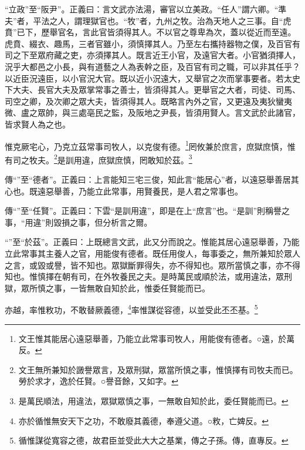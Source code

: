 {\noindent\shu{}\fzkt “立政”至“阪尹”。正義曰：言文武亦法湯，審官以立美政。“任人”謂六卿。“準夫”者，平法之人，謂理獄官也。“牧”者，九州之牧。治為天地人之三事。自“虎賁”已下，歷舉官名，言此官皆須得其人。不以官之尊卑為次，蓋以從近而至遠。虎賁、綴衣、趣馬，三者官雖小，須慎擇其人。乃至左右攜持器物之僕，及百官有司之下至眾府藏之吏，亦須擇其人。既言近王小官，及遠官大者。小官猶須擇人，況乎大都邑之小長，與有道藝之人為表幹之臣，及百官有司之職，可以非其任乎？以近臣況遠臣，以小官況大官。既以近小況遠大，又舉官之次而掌事要者。若太史下大夫、長官大夫及眾掌常事之善士，皆須得其人。更舉官之大者，司徒、司馬、司空之卿，及次卿之眾大夫，皆須得其人。既略言內外之官，又更遠及夷狄蠻夷微、盧之眾帥，與三處亳民之監，及阪地之尹長，皆須用賢人。言文武於此諸官，皆求賢人為之也。 \par}

惟克厥宅心，乃克立茲常事司牧人，以克俊有德。\footnote{文王惟其能居心遠惡舉善，乃能立此常事司牧人，用能俊有德者。○遠，於萬反。}罔攸兼於庶言，庶獄庶慎，惟有司之牧夫。\footnote{文王無所兼知於譭譽眾言，及眾刑獄，眾當所慎之事，惟慎擇有司牧夫而已。勞於求才，逸於任賢。○譽音餘，又如字。}是訓用違，庶獄庶慎，罔敢知於茲。\footnote{是萬民順法，用違法，眾獄眾慎之事，一無敢自知於此，委任賢能而已。}


{\noindent\zhuan{}\fzbyks 傳“”至“德者”。正義曰：上言能知三宅三俊，知此言“能居心”者，以遠惡舉善居其心也。既遠惡舉善，乃能立此常事，用賢養民，是人君之常事也。 \par}

{\noindent\zhuan{}\fzbyks 傳“”至“任賢”。正義曰：下雲“是訓用違”，即是在上“庶言”也。“是訓”則稱譽之事，“用違”則毀損之事，但分析言之爾。 \par}

{\noindent\shu{}\fzkt “”至“於茲”。正義曰：上既總言文武，此又分而說之。惟能其居心遠惡舉善，乃能立此常事其主養人之官，用能俊有德者。既任用俊人，每事委之，無所兼知於眾人之言，或毀或譽，皆不知也。眾獄斷罪得失，亦不得知也。眾所當慎之事，亦不得知也。惟慎擇在朝有司，在外牧養民之夫。是時萬民或順於法，或用違法，眾刑獄，眾所慎之事，一皆無敢自知於此，惟委任賢能而已。 \par}

亦越，率惟敉功，不敢替厥義德，\footnote{亦於循惟無安天下之功，不敢廢其義德，奉遵父道。○敉，亡婢反。}率惟謀從容德，以並受此丕丕基。\footnote{循惟謀從寬容之德，故君臣並受此大大之基業，傳之子孫。傳，直專反。}


